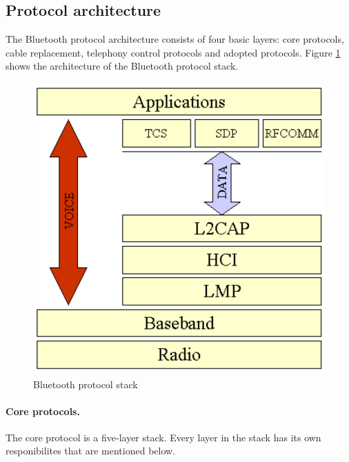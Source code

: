 \documentclass[a4paper, 11pt]{report}
\begin{document}
	\subsection{Protocol architecture}
The Bluetooth protocol architecture consists of four basic layers: core protocols, cable replacement, telephony control protocols and adopted protocols. Figure \ref{fig:bluetoothStack} shows the architecture of the Bluetooth protocol stack.
	\begin{figure}[ht]
		\centering
		\includegraphics[scale=0.5]{images/bluetoothStack.pdf}
		\caption{Bluetooth protocol stack}\label{fig:bluetoothStack}
	\end{figure}

		\paragraph{Core protocols.}
The core protocol is a five-layer stack. Every layer in the stack has its own responibilites that are mentioned below.
\end{document}
